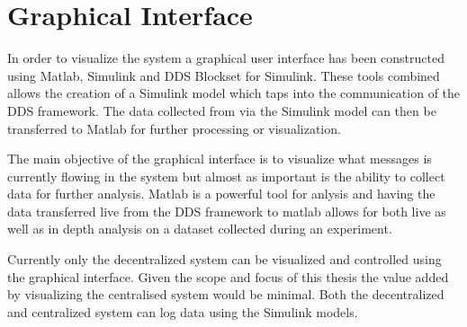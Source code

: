 %
%
%
%

\section{Graphical Interface} \label{sec:graphicalInterface}
In order to visualize the system a graphical user interface has been constructed using Matlab, Simulink and DDS Blockset for Simulink.
These tools combined allows the creation of a Simulink model which taps into the communication of the DDS framework.
The data collected from via the Simulink model can then be transferred to Matlab for further processing or visualization.

The main objective of the graphical interface is to visualize what messages is currently flowing in the system but almost as important is the ability to collect data for further analysis.
Matlab is a powerful tool for anlysis and having the data transferred live from the DDS framework to matlab allows for both live as well as in depth analysis on a dataset collected during an experiment.

Currently only the decentralized system can be visualized and controlled using the graphical interface. Given the scope and focus of this thesis the value added by visualizing the centralised system would be minimal. Both the decentralized and centralized system can log data using the Simulink models.

